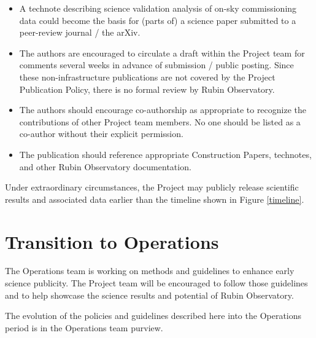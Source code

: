\documentclass[SE,authoryear,toc,lsstdraft]{lsstdoc}
\begin{document}
\begin{itemize}
  \item A technote describing science validation analysis of on-sky commissioning data could become the basis for (parts of) a science paper submitted to a peer-review journal / the arXiv.


  \item The authors are encouraged to circulate a draft within the Project team for comments several weeks in advance of submission / public posting.
  Since these non-infrastructure publications are not covered by the Project Publication Policy, there is no formal review by Rubin Observatory.

  \item The authors should encourage co-authorship as appropriate to recognize the contributions of other Project team members.
  No one should be listed as a co-author without their explicit permission.

  \item The publication should reference appropriate Construction Papers, technotes, and other Rubin Observatory documentation.

\end{itemize}

Under extraordinary circumstances, the Project may publicly release scientific results and associated data earlier than the timeline shown in Figure \ref{timeline}.

\section{Transition to Operations}
\label{operations}

The Operations team is working on methods and guidelines to enhance early science publicity.
The Project team will be encouraged to follow those guidelines and to help showcase the science results and potential of Rubin Observatory.

The evolution of the policies and guidelines described here into the Operations period is in the Operations team purview.
\end{document}

